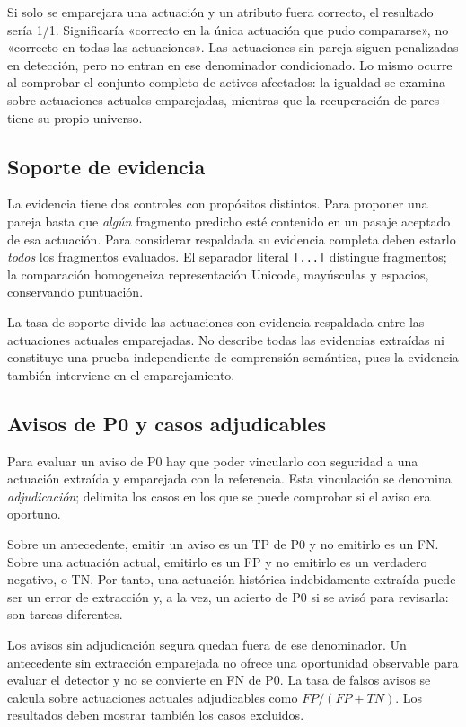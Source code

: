 Si solo se emparejara una actuación y un atributo fuera correcto, el resultado
sería 1/1. Significaría «correcto en la única actuación que pudo compararse»,
no «correcto en todas las actuaciones». Las actuaciones sin pareja siguen
penalizadas en detección, pero no entran en ese denominador condicionado.
Lo mismo ocurre al comprobar el conjunto completo de activos afectados:
la igualdad se examina sobre actuaciones actuales emparejadas, mientras
que la recuperación de pares tiene su propio universo.

\subsection{Soporte de evidencia}
La evidencia tiene dos controles con propósitos distintos. Para proponer
una pareja basta que \emph{algún} fragmento predicho esté contenido en un
pasaje aceptado de esa actuación. Para considerar respaldada su evidencia
completa deben estarlo \emph{todos} los fragmentos evaluados. El separador
literal \texttt{[...]} distingue fragmentos; la comparación homogeneiza
representación Unicode, mayúsculas y espacios, conservando puntuación.

La tasa de soporte divide las actuaciones con evidencia respaldada entre
las actuaciones actuales emparejadas. No describe todas las evidencias
extraídas ni constituye una prueba independiente de comprensión semántica,
pues la evidencia también interviene en el emparejamiento.

\subsection{Avisos de P0 y casos adjudicables}
Para evaluar un aviso de P0 hay que poder vincularlo con seguridad a una
actuación extraída y emparejada con la referencia. Esta vinculación se
denomina \emph{adjudicación}; delimita los casos en los que se puede
comprobar si el aviso era oportuno.

Sobre un antecedente, emitir un aviso es un TP de P0 y no emitirlo es un FN.
Sobre una actuación actual, emitirlo es un FP y no emitirlo es un verdadero
negativo, o TN. Por tanto, una actuación histórica indebidamente extraída
puede ser un error de extracción y, a la vez, un acierto de P0 si se avisó
para revisarla: son tareas diferentes.

Los avisos sin adjudicación segura quedan fuera de ese denominador.
Un antecedente sin extracción emparejada no ofrece una oportunidad observable
para evaluar el detector y no se convierte en FN de P0. La tasa de falsos
avisos se calcula sobre actuaciones actuales adjudicables como
\(FP/(FP+TN)\). Los resultados deben mostrar también los casos excluidos.

